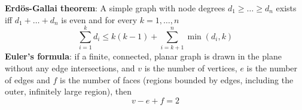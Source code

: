 \textbf{Erdös-Gallai theorem}: A simple graph with node degrees $d_1 \geq \ldots \geq d_n$ exists
iff $d_1+\ldots+d_n$ is even and for every $k=1,\ldots,n$
\[
    \sum_{i=1}^{k}d_i \leq k(k-1) + \sum_{i=k+1}^{n} \min(d_i,k)
\]
\textbf{Euler's formula}: if a finite, connected, planar graph is drawn in the plane without any edge 
intersections, and $v$ is the number of vertices, $e$ is the number of edges and $f$ is the number of 
faces (regions bounded by edges, including the outer, infinitely large region), then
\[
    v-e+f = 2
\]